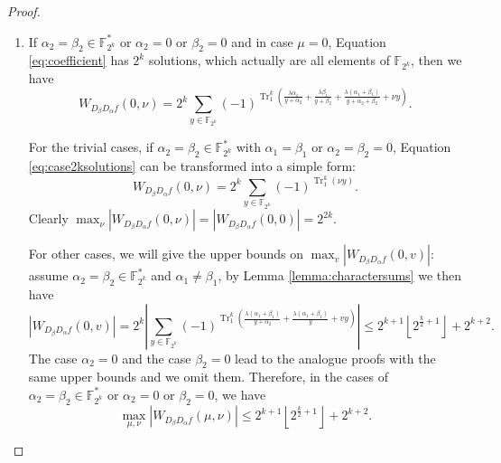 \documentclass{article}
\newcommand{\F}{\mathbb{F}}
\newcommand{\0}{\textbf{0}}
\newcommand{\1}{\textbf{1}}
\newcommand{\TRACE}{\operatorname{Tr}_1^k}
\theoremstyle{plain}
\begin{document}
\begin{proof}
        \begin{enumerate}[label=\textbf{Case \arabic*},wide = 0pt]
            \item If $\alpha_2=\beta_2\in\F_{2^k}^*$ or $\alpha_2=0$ or $\beta_2=0$ and in case $\mu=0$, Equation \eqref{eq:coefficient} has $2^k$ solutions, which actually are all elements of $\F_{2^k}$, then we have
            \begin{equation}\label{eq:case2ksolutions}
                W_{D_{\beta}D_{\alpha}f}(0,\nu)=2^k\sum_{y\in\F_{2^k}}(-1)^{\TRACE\left(\frac{\lambda\alpha_1}{y+\alpha_2}+\frac{\lambda\beta_1}{y+\beta_2}+\frac{\lambda(\alpha_1+\beta_1)}{y+\alpha_2+\beta_2}+\nu y\right)}.
            \end{equation}

            For the trivial cases, if $\alpha_2=\beta_2\in\F_{2^k}^*$ with $\alpha_1=\beta_1$ or $\alpha_2=\beta_2=0$, Equation \eqref{eq:case2ksolutions} can be transformed into a simple form:
            \[W_{D_{\beta}D_{\alpha}f}(0,\nu)=2^k\sum_{y\in\F_{2^k}}(-1)^{\TRACE\left(\nu y\right)}.\]
            Clearly $\max_{\nu}|W_{D_{\beta}D_{\alpha}f}(0,\nu)|=|W_{D_{\beta}D_{\alpha}f}(0,0)|=2^{2k}$.

            For other cases, we will give the upper bounds on $\max_{v}|W_{D_{\beta}D_{\alpha}f}(0,v)|$:
            assume $\alpha_2=\beta_2\in\F_{2^k}^*$ and $\alpha_1\ne\beta_1$, by Lemma \ref{lemma:charactersums} we then have
            \[\left\lvert W_{D_{\beta}D_{\alpha}f}(0,v)\right\rvert =2^k\left\lvert \sum_{y\in\F_{2^k}}(-1)^{\TRACE\left(\frac{\lambda(\alpha_1+\beta_1)}{y+\alpha_2}+\frac{\lambda(\alpha_1+\beta_1)}{y}+vy\right)}\right\rvert\le 2^{k+1}\left\lfloor 2^{\frac{k}{2}+1}\right\rfloor+2^{k+2}.\]
            The case $\alpha_2=0$ and the case $\beta_2=0$ lead to the analogue proofs with the same upper bounds and we omit them.
            Therefore, in the cases of $\alpha_2=\beta_2\in\F_{2^k}^*$ or $\alpha_2=0$ or $\beta_2=0$, we have
            \[\max_{\mu,\nu}|W_{D_{\beta}D_{\alpha}f}(\mu,\nu)|\le 2^{k+1}\left\lfloor 2^{\frac{k}{2}+1}\right\rfloor+2^{k+2}.\]


\end{enumerate}
\end{proof}
\end{document}
